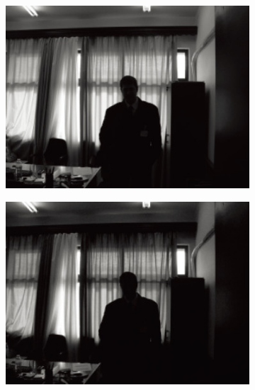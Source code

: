 \documentclass[letterpaper,10pt]{article}
\begin{document}
\begin{figure}[htbp]
\begin{subfigure}{0.11\textwidth}
					\includegraphics[width=\linewidth]{picture/LLIE/Division Gets Better/G2}
					\captionsetup{font=scriptsize}
					\label{fig: G2}
				\end{subfigure}
				\begin{subfigure}{0.11\textwidth}
					\includegraphics[width=\linewidth]{picture/LLIE/Division Gets Better/B2}
					\captionsetup{font=scriptsize}
					\label{fig: B2}	
				\end{subfigure}
				\begin{subfigure}{0.11\textwidth}

\end{subfigure}
\end{figure}
\end{document}
